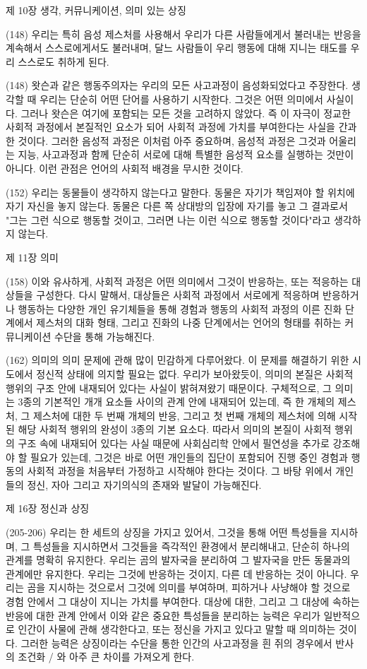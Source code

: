 \documentclass[11pt, a4paper]{article}
\begin{document}
제 10장 생각, 커뮤니케이션, 의미 있는 상징

(148) 우리는 특히 음성 제스처를 사용해서 우리가 다른 사람들에게서 불러내는 반응을 계속해서 스스로에게서도 불러내며, 달느 사람들이 우리 행동에 대해 지니는 태도를 우리 스스로도 취하게 된다.

(148) 왓슨과 같은 행동주의자는 우리의 모든 사고과정이 음성화되었다고 주장한다. 생각할 때 우리는 단순히 어떤 단어를 사용하기 시작한다. 그것은 어떤 의미에서 사실이다. 그러나 왓슨은 여기에 포함되는 모든 것을 고려하지 않았다. 즉 이 자극이 정교한 사회적 과정에서 본질적인 요소가 되어 사회적 과정에 가치를 부여한다는 사실을 간과한 것이다. 그러한 음성적 과정은 이처럼 아주 중요하며, 음성적 과정은 그것과 어울리는 지능, 사고과정과 함께 단순히 서로에 대해 특별한 음성적 요소를 실행하는 것만이 아니다. 이런 관점은 언어의 사회적 배경을 무시한 것이다.

(152) 우리는 동물들이 생각하지 않는다고 말한다. 동물은 자기가 책임져야 할 위치에 자기 자신을 놓지 않는다. 동물은 다른 쪽 상대방의 입장에 자기를 놓고 그 결과로서 "그는 그런 식으로 행동할 것이고, 그러면 나는 이런 식으로 행동할 것이다"라고 생각하지 않는다. 

제 11장 의미

(158) 이와 유사하게, 사회적 과정은 어떤 의미에서 그것이 반응하는, 또는 적응하는 대상들을 구성한다. 다시 말해서, 대상들은 사회적 과정에서 서로에게 적응하며 반응하거나 행동하는 다양한 개인 유기체들을 통해 경험과 행동의 사회적 과정의 이른 진화 단계에서 제스처의 대화 형태, 그리고 진화의 나중 단계에서는 언어의 형태를 취하는 커뮤니케이션 수단을 통해 가능해진다. 

(162) 의미의 의미 문제에 관해 많이 민감하게 다루어왔다. 이 문제를 해결하기 위한 시도에서 정신적 상태에 의지할 필요는 없다. 우리가 보아왔듯이, 의미의 본질은 사회적 행위의 구조 안에 내재되어 있다는 사실이 밝혀져왔기 때문이다. 구체적으로, 그 의미는 3종의 기본적인 개개 요소들 사이의 관계 안에 내재되어 있는데, 즉 한 개체의 제스처, 그 제스처에 대한 두 번째 개체의 반응, 그리고 첫 번째 개체의 제스처에 의해 시작된 해당 사회적 행위의 완성이 3종의 기본 요소다. 따라서 의미의 본질이 사회적 행위의 구조 속에 내재되어 있다는 사실 때문에 사회심리학 안에서 필연성을 추가로 강조해야 할 필요가 있는데, 그것은 바로 어떤 개인들의 집단이 포함되어 진행 중인 경험과 행동의 사회적 과정을 처음부터 가정하고 시작해야 한다는 것이다. 그 바탕 위에서 개인들의 정신, 자아 그리고 자기의식의 존재와 발달이 가능해진다.

제 16장 정신과 상징

(205-206) 우리는 한 세트의 상징을 가지고 있어서, 그것을 통해 어떤 특성들을 지시하며, 그 특성들을 지시하면서 그것들을 즉각적인 환경에서 분리해내고, 단순히 하나의 관계를 명확히 유지한다. 우리는 곰의 발자국을 분리하여 그 발자국을 만든 동물과의 관계에만 유지한다. 우리는 그것에 반응하는 것이지, 다른 데 반응하는 것이 아니다. 우리는 곰을 지시하는 것으로서 그것에 의미를 부여하며, 피하거나 사냥해야 할 것으로 경험 안에서 그 대상이 지니는 가치를 부여한다. 대상에 대한, 그리고 그 대상에 속하는 반응에 대한 관계 안에서 이와 같은 중요한 특성들을 분리하는 능력은 우리가 일반적으로 인간이 사물에 관해 생각한다고, 또는 정신을 가지고 있다고 말할 때 의미하는 것이다. 그러한 능력은 상징이라는 수단을 통한 인간의 사고과정을 흰 쥐의 경우에서 반사의 조건화 / 와 아주 큰 차이를 가져오게 한다. 
\end{document}
